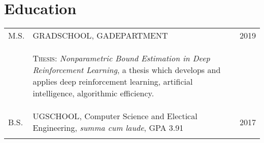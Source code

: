 \documentclass[a4paper,10pt]{article}
\begin{document}
\section{Education}
\begin{supertabular}{p{1.5cm}p{13.9cm}>{\raggedleft\arraybackslash}p{1.5cm}}
	\textsc{M.S.} & \textsc{GRADSCHOOL}, \small GADEPARTMENT 			
	& 	\textsc{2019} \\
	& \begin{enumerate*}[label =$\circ$, itemjoin={\newline}] 
	\item \footnotesize \textsc{Thesis:} \emph{Nonparametric Bound Estimation in Deep Reinforcement Learning}, a thesis which develops and applies deep reinforcement learning, artificial intelligence, algorithmic efficiency. 
	\end{enumerate*} 														
	& \\
	\textsc{B.S.} & \textsc{UGSCHOOL}, \small Computer Science and Electical Engineering, \emph{summa cum laude}, GPA 3.91 
	&	\textsc{2017} 	\\
	 \\
\end{supertabular}



\end{document}
